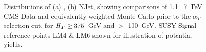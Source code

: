 \begin{figure}[htpb]
\centering
\begin{minipage}[b]{1.\linewidth}
\centering
{}
\hspace{0.2cm}
\end{minipage}
    \caption{\label{fig:preselplota}Distributions of (a) \HT, (b) NJet, showing comparisons of 1.1~ 7~TeV CMS Data and equivalently weighted Monte-Carlo prior to the $\alpha_{T}$ selection cut, for $H_{T} \geq 375$~GeV and \MHT $>$ 100~GeV. SUSY Signal reference points LM4 \& LM6 shown for illustration of potential yields.}
\end{figure}

